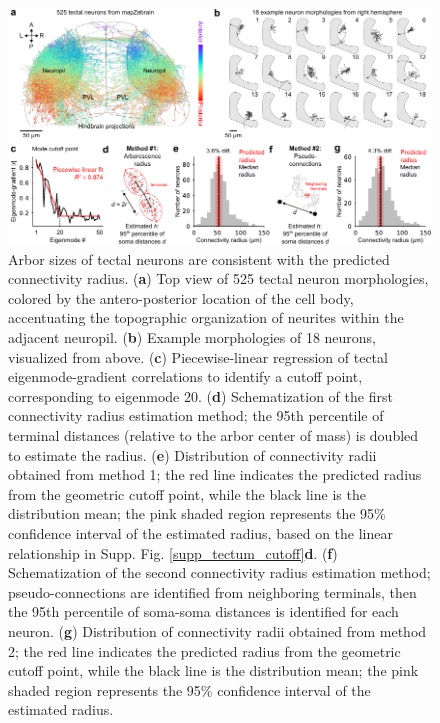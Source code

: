 \documentclass{article}
\begin{document}
\begin{figure}[t]
    \centering
    \includegraphics[width=1.0\linewidth]{figures/figure7.pdf}
    \caption{Arbor sizes of tectal neurons are consistent with the predicted connectivity radius. (\textbf{a}) Top view of 525 tectal neuron morphologies, colored by the antero-posterior location of the cell body, accentuating the topographic organization of neurites within the adjacent neuropil. (\textbf{b}) Example morphologies of 18 neurons, visualized from above. (\textbf{c}) Piecewise-linear regression of tectal eigenmode-gradient correlations to identify a cutoff point, corresponding to eigenmode 20. (\textbf{d}) Schematization of the first connectivity radius estimation method; the 95th percentile of terminal distances (relative to the arbor center of mass) is doubled to estimate the radius. (\textbf{e}) Distribution of connectivity radii obtained from method 1; the red line indicates the predicted radius from the geometric cutoff point, while the black line is the distribution mean; the pink shaded region represents the 95\% confidence interval of the estimated radius, based on the linear relationship in Supp. Fig. \ref{supp_tectum_cutoff}\textbf{d}. (\textbf{f}) Schematization of the second connectivity radius estimation method; pseudo-connections are identified from neighboring terminals, then the 95th percentile of soma-soma distances is identified for each neuron. (\textbf{g}) Distribution of connectivity radii obtained from method 2; the red line indicates the predicted radius from the geometric cutoff point, while the black line is the distribution mean; the pink shaded region represents the 95\% confidence interval of the estimated radius.}
    \label{fig7}
    \hrulefill
\end{figure}
\end{document}
